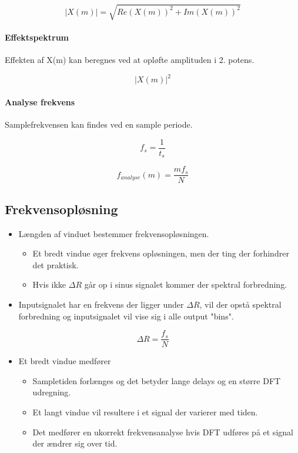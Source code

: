 \documentclass[danish]{article}
\begin{document}
\begin{equation}
|X(m)|=\sqrt{Re(X(m))^2+Im(X(m))^2}
\end{equation}

\paragraph{Effektspektrum} Effekten af X(m) kan beregnes ved at opløfte amplituden i 2. potens. 

\begin{equation}
|X(m)|^2
\end{equation}

\paragraph{Analyse frekvens} Samplefrekvensen kan findes ved en sample periode.

\begin{equation}
f_s=\frac{1}{t_s}
\end{equation}

\begin{equation}
f_{analyse}(m)=\frac{m f_s}{N}
\end{equation}

\subsection{Frekvensopløsning}
	\begin{itemize}
	\item Længden af vinduet bestemmer frekvensopløsningen.
­	\begin{itemize}
	\item Et bredt vindue øger frekvens opløsningen, men der ting der forhindrer det praktisk.
	\item Hvis ikke $\Delta R$ går op i sinus signalet kommer der spektral forbredning.
\end{itemize} 
	\item Inputsignalet har en frekvens der ligger under $\Delta R$, vil der opstå spektral forbredning og inputsignalet vil vise sig i alle output "bins".
\end{itemize}

\begin{equation}
\Delta R = \frac{f_s}{N}
\end{equation}

\begin{itemize}
	\item Et bredt vindue medfører
­	\begin{itemize}
	\item Sampletiden forlænges og det betyder lange delays og en større DFT udregning.
­	\item Et langt vindue vil resultere i et signal der varierer med tiden.
­	\item Det medfører en ukorrekt frekvensanalyse hvis DFT udføres på et signal der ændrer sig over tid.
	\end{itemize}
\end{itemize}
\end{document}
